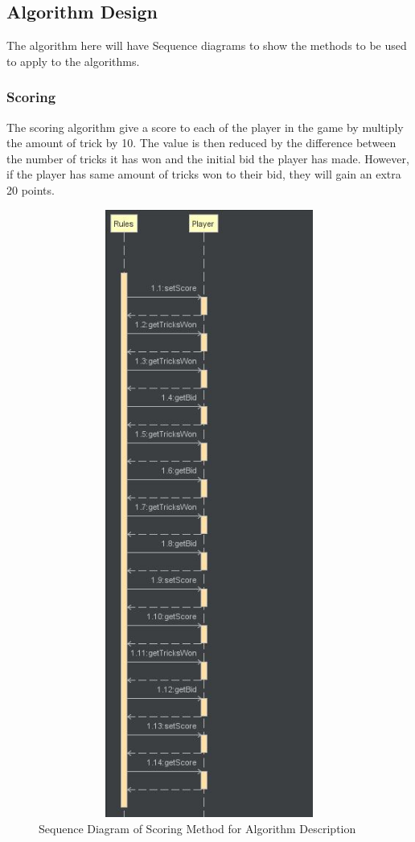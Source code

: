 \subsection{Algorithm Design}
The algorithm here will have Sequence diagrams to show the methods to be used to apply to the algorithms.
\subsubsection{Scoring}
The scoring algorithm give a score to each of the player in the game by multiply the amount of trick by 10. The value is then reduced by the difference between the number of tricks it has won and the initial bid the player has made. However, if the player has same amount of tricks won to their bid, they will gain an extra 20 points.
\begin{figure}
\centering
\includegraphics[width=15cm ,height=20cm,keepaspectratio]{ScoringSequenceDiagram}
\caption{Sequence Diagram of Scoring Method for Algorithm Description}
\label{fig:Scoring}
\end{figure}
